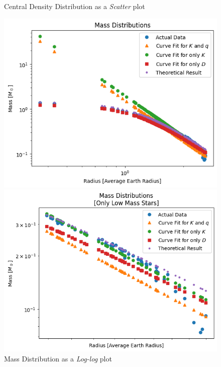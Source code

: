 \documentclass[letterpaper,12pt]{article}
\begin{document}
\begin{figure}[H]
\begin{minipage}{.5\textwidth}
\end{minipage}
\caption{Central Density Distribution as a \textit{Scatter} plot}
\label{fig:34}
\end{figure}



\begin{figure}[H]
\begin{minipage}{.5\textwidth}
\centerline{\includegraphics[width=\linewidth]{figures/7_n_ll_ms_r.png}}
\end{minipage}
\begin{minipage}{.5\textwidth}
\centerline{\includegraphics[width=\linewidth]{figures/8_n_ll_ms_r_.png}}
\end{minipage}
\caption{Mass Distribution as a \textit{Log-log} plot}
\label{fig:78}
\end{figure}
\end{document}
